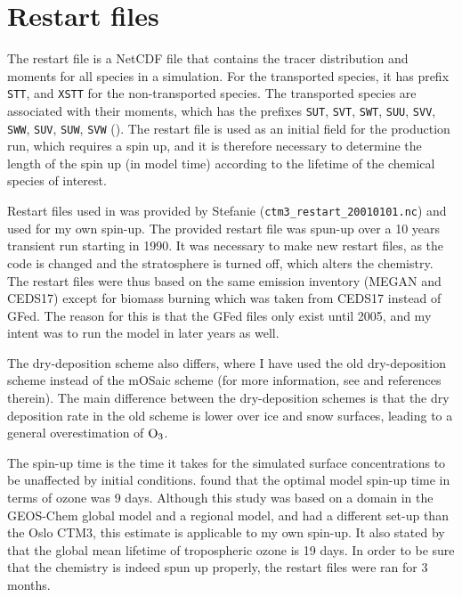 




\section{Restart files}\label{subsec:restart_files}


The restart file is a NetCDF file that contains the tracer distribution and moments for all species in a simulation. For the transported species, it has prefix \texttt{STT}, and \texttt{XSTT} for the non-transported species. The transported species are associated with their moments, which has the prefixes \texttt{SUT}, \texttt{SVT}, \texttt{SWT}, \texttt{SUU}, \texttt{SVV}, \texttt{SWW}, \texttt{SUV}, \texttt{SUW}, \texttt{SVW} (\cite{SovdeManual}). The restart file is used as an initial field for the production run, which requires a spin up, and it is therefore necessary to determine the length of the spin up (in model time) according to the lifetime of the chemical species of interest. 

\medskip

Restart files used in \cite{Falk_2019} was provided by Stefanie (\texttt{ctm3\_restart\_20010101.nc}) and used for my own spin-up. The provided restart file was spun-up over a 10 years transient run starting in 1990. It was necessary to make new restart files, as the code is changed and the stratosphere is turned off, which alters the chemistry. The restart files were thus based on the same emission inventory (MEGAN and CEDS17) except for biomass burning which was taken from CEDS17 instead of GFed. The reason for this is that the GFed files only exist until 2005, and my intent was to run the model in later years as well. 

\medskip


The dry-deposition scheme also differs, where I have used the old dry-deposition scheme instead of the mOSaic scheme (for more information, see \cite{Falk_2019} and references therein). The main difference between the dry-deposition schemes is that the dry deposition rate in the old scheme is lower over ice and snow surfaces, leading to a general overestimation of $\mathrm{O_3}$.


\medskip

The spin-up time is the time it takes for the simulated surface concentrations to be unaffected by initial conditions. \cite{Curci_AirPollution} found that the optimal model spin-up time in terms of ozone was 9 days. Although this study was based on a domain in the GEOS-Chem global model and a regional model, and had a different set-up than the Oslo CTM3, this estimate is applicable to my own spin-up. It also stated by \cite{SeinfeldSpyros} that the global mean lifetime of tropospheric ozone is 19 days. In order to be sure that the chemistry is indeed spun up properly, the restart files were ran for 3 months. 

